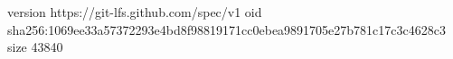 version https://git-lfs.github.com/spec/v1
oid sha256:1069ee33a57372293e4bd8f98819171cc0ebea9891705e27b781c17c3c4628c3
size 43840
